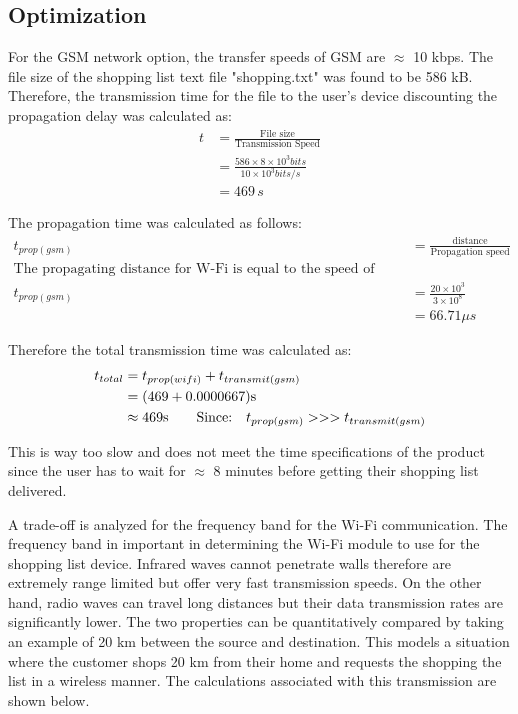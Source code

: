 \subsection{Optimization}
For the GSM network option, the transfer speeds of GSM are $\approx$ 10 kbps. The file size of the shopping list text file "shopping.txt" was found to be 586 kB. Therefore, the transmission time for the file to the user's device discounting the propagation delay was calculated as:
\begin{align*}
	t &= \frac{\text{File size}}{\text{Transmission Speed}}\\
	&= \frac{586 \times 8 \times 10^3 bits}{10 \times 10^3 bits/s}\\
	&= 469\,s
\end{align*}

The propagation time was calculated as follows:
\begin{align*}
t_{prop(gsm)} &= \frac{\text{distance}}{\text{Propagation speed}}\\
\text{The propagating distance for W-Fi is equal to the speed of light so that:}\\
t_{prop(gsm)} &= \frac{20 \times 10^3}{3 \times 10^8}\\
&= 66.71 \mu s	
\end{align*}

Therefore the total transmission time was calculated as:
\begin{align*}
t_{total} &= t_{prop(wifi)} + t_{transmit(gsm)}\\
&= (469 + 0.0000667) \text{s}\\
&\approx 469 \text{s} \quad \quad \text{Since:\quad} t_{prop(gsm)}>>>t_{transmit(gsm)}
\end{align*}

This is way too slow and does not meet the time specifications of the product since the user has to wait for $\approx$ 8 minutes before getting their shopping list delivered.

A trade-off is analyzed for the frequency band for the Wi-Fi communication. The frequency band in important in determining the Wi-Fi module to use for the shopping list device. Infrared waves cannot penetrate walls therefore are extremely range limited but offer very fast transmission speeds. On the other hand, radio waves can travel long distances but their data transmission rates are significantly lower. The two properties can be quantitatively compared by taking an example of 20 km between the source and destination. This models a situation where the customer shops 20 km from their home and requests the shopping the list in a wireless manner. The calculations associated with this transmission are shown below.\\

